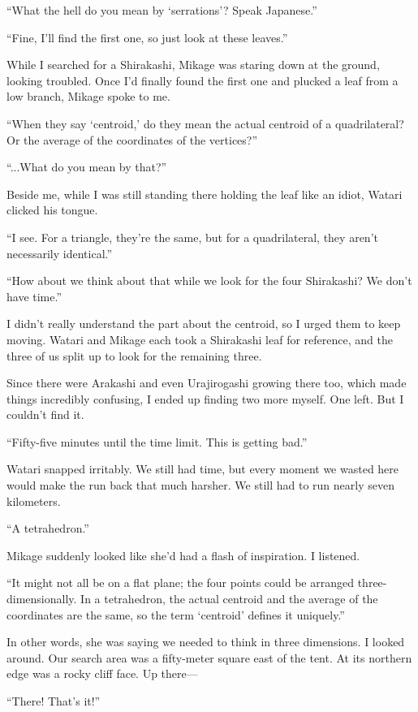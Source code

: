 \documentclass[
    a4paper,
    12pt,
    twoside,
    openany,
    UTF8,
    fontset=windows
]{ctexbook}
\begin{document}
``What the hell do you mean by `serrations'? Speak Japanese.''

``Fine, I'll find the first one, so just look at these leaves.''

While I searched for a Shirakashi, Mikage was staring down at the ground, looking troubled. Once I'd finally found the first one and plucked a leaf from a low branch, Mikage spoke to me.

``When they say `centroid,' do they mean the actual centroid of a quadrilateral? Or the average of the coordinates of the vertices?''

``...What do you mean by that?''

Beside me, while I was still standing there holding the leaf like an idiot, Watari clicked his tongue.

``I see. For a triangle, they're the same, but for a quadrilateral, they aren't necessarily identical.''

``How about we think about that while we look for the four Shirakashi? We don't have time.''

I didn't really understand the part about the centroid, so I urged them to keep moving. Watari and Mikage each took a Shirakashi leaf for reference, and the three of us split up to look for the remaining three.

Since there were Arakashi and even Urajirogashi growing there too, which made things incredibly confusing, I ended up finding two more myself. One left. But I couldn't find it.

``Fifty-five minutes until the time limit. This is getting bad.''

Watari snapped irritably. We still had time, but every moment we wasted here would make the run back that much harsher. We still had to run nearly seven kilometers.

``A tetrahedron.''

Mikage suddenly looked like she'd had a flash of inspiration. I listened.

``It might not all be on a flat plane; the four points could be arranged three-dimensionally. In a tetrahedron, the actual centroid and the average of the coordinates are the same, so the term `centroid' defines it uniquely.''

In other words, she was saying we needed to think in three dimensions. I looked around. Our search area was a fifty-meter square east of the tent. At its northern edge was a rocky cliff face. Up there---

``There! That's it!''
\end{document}
